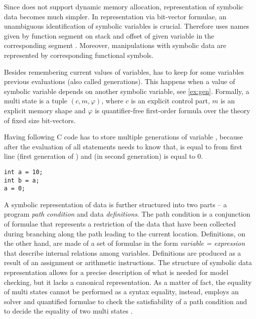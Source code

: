 Since \SymDIVINE does not support dynamic memory allocation, representation
of symbolic data becomes much simpler. In representation via bit-vector
\SMT formulae, an unambiguous identification of symbolic variables is crucial.
Therefore \SymDIVINE uses names given by function
segment on stack and offset of given variable in the corresponding segment \cite{Mrazek16}.
Moreover, manipulations with symbolic data are represented by corresponding functional symbols.

Besides remembering current values of variables, \SymDIVINE has to keep for
some variables previous evaluations (also called generations). This happens when
a value of symbolic variable depends on another symbolic variable, see \autoref{ex:gen}. Formally,
a multi state is a tuple $(c, m, \varphi)$, where $c$ is an explicit control part, $m$ is an
explicit memory shape and $\varphi$ is quantifier-free first-order formula over the theory of fixed size
bit-vectors.


\begin{example}\label{ex:gen}
Having following C code \SymDIVINE has to store multiple generations of variable
, because after the evaluation of all statements \SymDIVINE needs to know
that,  is equal to  from first line (first generation of
) and  (in second generation) is equal to $0$.

\begin{verbatim}
int a = 10;
int b = a;
a = 0;
\end{verbatim}

\end{example}

A symbolic representation of data is further structured into two parts -- a
program \emph{path condition} and data \emph{definitions}. The path condition is a
conjunction of formulae that represents a restriction of the data that have been
collected during branching along the path leading to the current location.
Definitions, on the other hand, are made of a set of formulae in the form
\emph{variable = expression} that describe internal relations among variables.
Definitions are produced as a result of an assignment or arithmetic
instructions. The structure of symbolic data representation allows for a
precise description of what is needed for model checking, but it lacks a
canonical representation. As a matter of fact, the equality of multi states
cannot be performed as a syntax equality, instead, \SymDIVINE employs an \SMT
solver and quantified formulae to check the satisfiability of a path condition
and to decide the equality of two multi states \cite{Mrazek16}.

